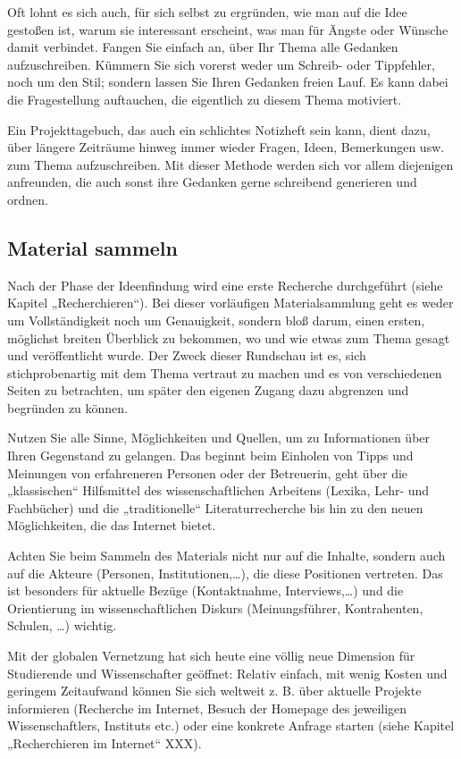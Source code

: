 \documentclass[]{book}
\theoremstyle{definition}
\theoremstyle{definition}
\theoremstyle{definition}
\theoremstyle{remark}
\begin{document}
Oft lohnt es sich auch, für sich selbst zu ergründen, wie man auf die
Idee gestoßen ist, warum sie interessant erscheint, was man für Ängste
oder Wünsche damit verbindet. Fangen Sie einfach an, über Ihr Thema alle
Gedanken aufzuschreiben. Kümmern Sie sich vorerst weder um Schreib- oder
Tippfehler, noch um den Stil; sondern lassen Sie Ihren Gedanken freien
Lauf. Es kann dabei die Fragestellung auftauchen, die eigentlich zu
diesem Thema motiviert.

Ein Projekttagebuch, das auch ein schlichtes Notizheft sein kann, dient
dazu, über längere Zeiträume hinweg immer wieder Fragen, Ideen,
Bemerkungen usw. zum Thema aufzuschreiben. Mit dieser Methode werden
sich vor allem diejenigen anfreunden, die auch sonst ihre Gedanken gerne
schreibend generieren und ordnen.

\subsection{Material sammeln}\label{konzipieren-material-sammeln}

Nach der Phase der Ideenfindung wird eine erste Recherche durchgeführt
(siehe Kapitel „Recherchieren``). Bei dieser vorläufigen
Materialsammlung geht es weder um Vollständigkeit noch um Genauigkeit,
sondern bloß darum, einen ersten, möglichst breiten Überblick zu
bekommen, wo und wie etwas zum Thema gesagt und veröffentlicht wurde.
Der Zweck dieser Rundschau ist es, sich stichprobenartig mit dem Thema
vertraut zu machen und es von verschiedenen Seiten zu betrachten, um
später den eigenen Zugang dazu abgrenzen und begründen zu können.

Nutzen Sie alle Sinne, Möglichkeiten und Quellen, um zu Informationen
über Ihren Gegenstand zu gelangen. Das beginnt beim Einholen von Tipps
und Meinungen von erfahreneren Personen oder der Betreuerin, geht über
die „klassischen`` Hilfsmittel des wissenschaftlichen Arbeitens (Lexika,
Lehr- und Fachbücher) und die „traditionelle`` Literaturrecherche bis
hin zu den neuen Möglichkeiten, die das Internet bietet.

Achten Sie beim Sammeln des Materials nicht nur auf die Inhalte, sondern
auch auf die Akteure (Personen, Institutionen,\ldots{}), die diese
Positionen vertreten. Das ist besonders für aktuelle Bezüge
(Kontaktnahme, Interviews,\ldots{}) und die Orientierung im
wissenschaftlichen Diskurs (Meinungsführer, Kontrahenten, Schulen,
\ldots{}) wichtig.

Mit der globalen Vernetzung hat sich heute eine völlig neue Dimension
für Studierende und Wissenschafter geöffnet: Relativ einfach, mit wenig
Kosten und geringem Zeitaufwand können Sie sich weltweit z. B. über
aktuelle Projekte informieren (Recherche im Internet, Besuch der
Homepage des jeweiligen Wissenschaftlers, Instituts etc.) oder eine
konkrete Anfrage starten (siehe Kapitel „Recherchieren im Internet``
XXX).
\end{document}
